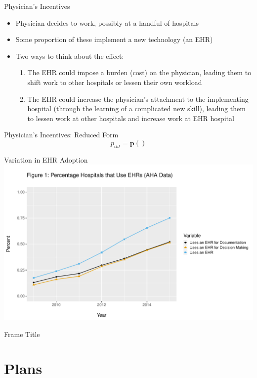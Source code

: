 \documentclass[10pt]{beamer}
\begin{document}
\begin{frame}{Physician's Incentives}
\begin{itemize}
    \item Physician decides to work, possibly at a handful of hospitals
    \item Some proportion of these implement a new technology (an EHR)
    \item Two ways to think about the effect:
    \begin{enumerate}
        \item The EHR could impose a burden (cost) on the physician, leading them to shift work to other hospitals or lessen their own workload
        \item The EHR could increase the physician's attachment to the implementing hospital (through the learning of a complicated new skill), leading them to lessen work at other hospitals and increase work at EHR hospital
    \end{enumerate}
\end{itemize}
\end{frame}

\begin{frame}{Physician's Incentives: Reduced Form}
\begin{equation*}
    p_{iht}=\textbf{p}()
\end{equation*}
    
\end{frame}

\begin{frame}{Variation in EHR Adoption}
\centering
\includegraphics[scale=.55]{Objects/TYP_plot_hospEHR_year.pdf}
\end{frame}

\begin{frame}{Frame Title}
    
\end{frame}






\section{Plans}
\end{document}
